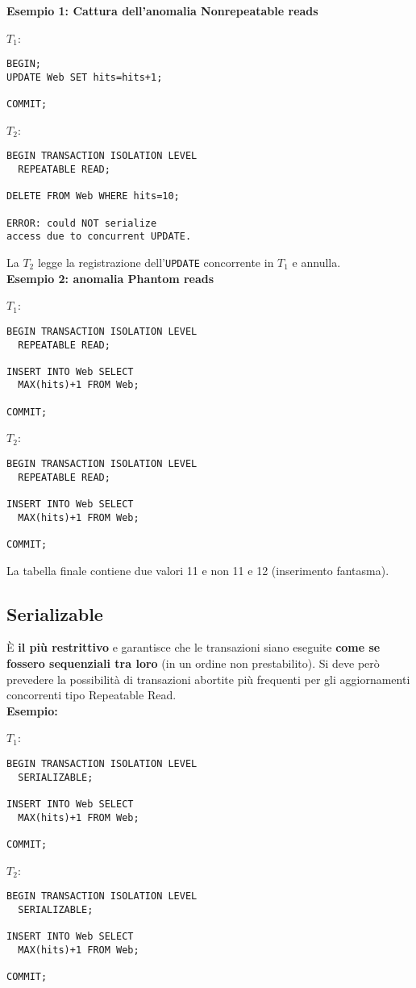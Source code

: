 \documentclass[a4paper, 10pt, titlepage]{article}
\begin{document}
			\noindent
			\textbf{Esempio 1: Cattura dell'anomalia Nonrepeatable reads}
			\begin{multicols}{2}
			\noindent
			$ T_1 $:
			\begin{lstlisting}
BEGIN;
UPDATE Web SET hits=hits+1;

COMMIT;
			\end{lstlisting}
			\columnbreak
			$ T_2 $:
			\begin{lstlisting}
BEGIN TRANSACTION ISOLATION LEVEL
  REPEATABLE READ;

DELETE FROM Web WHERE hits=10;

ERROR: could NOT serialize 
access due to concurrent UPDATE.
			\end{lstlisting}
			\end{multicols} 
			La $T_2$ legge la registrazione dell'\lstinline|UPDATE| concorrente in $T_1$ e annulla. \medskip \\
			\textbf{Esempio 2: anomalia Phantom reads}
			\begin{multicols}{2}
			\noindent
			$ T_1 $:
			\begin{lstlisting}
BEGIN TRANSACTION ISOLATION LEVEL
  REPEATABLE READ;
 
INSERT INTO Web SELECT
  MAX(hits)+1 FROM Web;
  
COMMIT;
			\end{lstlisting}
			\columnbreak
			$ T_2 $:
			\begin{lstlisting}
BEGIN TRANSACTION ISOLATION LEVEL
  REPEATABLE READ;

INSERT INTO Web SELECT
  MAX(hits)+1 FROM Web;

COMMIT;
			\end{lstlisting}
			\end{multicols}
La tabella finale contiene due valori 11 e non 11 e 12 (inserimento fantasma).
		
	\subsection{Serializable}
		È \textbf{il più restrittivo} e garantisce che le transazioni siano eseguite \textbf{come se fossero sequenziali tra loro} (in un ordine non prestabilito). Si deve però prevedere la possibilità di transazioni abortite più frequenti per gli aggiornamenti concorrenti tipo Repeatable Read.\medskip \\
		\textbf{Esempio:}
		\begin{multicols}{2}
		\noindent
		$ T_1 $:
		\begin{lstlisting}
BEGIN TRANSACTION ISOLATION LEVEL
  SERIALIZABLE;
  
INSERT INTO Web SELECT
  MAX(hits)+1 FROM Web;

COMMIT;
		\end{lstlisting}
		\columnbreak
		$ T_2 $:
		\begin{lstlisting}
BEGIN TRANSACTION ISOLATION LEVEL
  SERIALIZABLE;

INSERT INTO Web SELECT
  MAX(hits)+1 FROM Web;

COMMIT;
		\end{lstlisting}
		\end{multicols}
		
\end{document}
